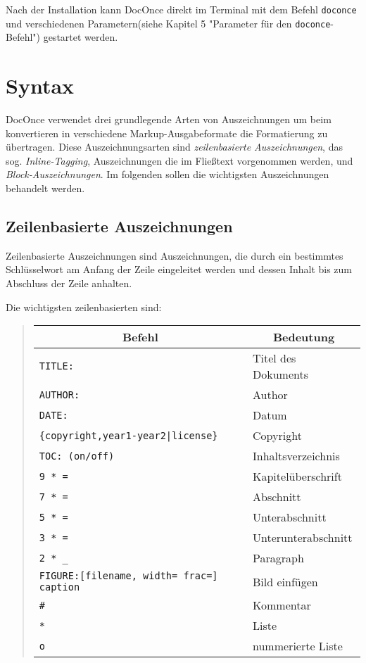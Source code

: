 \documentclass[%
oneside,                 %
final,                   %
chapterprefix=true,      %
open=right,              %
10pt]{book}
\begin{document}
Nach der Installation kann DocOnce direkt im Terminal mit dem Befehl \texttt{doconce} und verschiedenen Parametern(siehe Kapitel 5 "Parameter für den \texttt{doconce}-Befehl") gestartet werden.
\chapter{Syntax}
DocOnce verwendet drei grundlegende Arten von Auszeichnungen um beim konvertieren in verschiedene Markup-Ausgabeformate die Formatierung zu übertragen. Diese Auszeichnungsarten sind  \emph{zeilenbasierte Auszeichnungen}, das sog. \emph{Inline-Tagging}, Auszeichnungen die im Fließtext vorgenommen werden, und \emph{Block-Auszeichnungen}. Im folgenden sollen die wichtigsten Auszeichnungen behandelt werden.

\section{Zeilenbasierte Auszeichnungen}
Zeilenbasierte Auszeichnungen sind Auszeichnungen, die durch ein bestimmtes Schlüsselwort am Anfang der Zeile eingeleitet werden und dessen Inhalt bis zum Abschluss der Zeile anhalten.

Die wichtigsten zeilenbasierten sind:

\begin{quote}
\begin{tabular}{ll}
\hline
\multicolumn{1}{c}{ Befehl } & \multicolumn{1}{c}{ Bedeutung } \\
\hline
\texttt{TITLE:}                                  & Titel des Dokuments \\
\texttt{AUTHOR:}                                 & Author              \\
\texttt{DATE:}                                   & Datum               \\
\Verb!{copyright,year1-year2|license}!         & Copyright           \\
\texttt{TOC: (on/off)}                           & Inhaltsverzeichnis  \\
\texttt{9 * =}                                   & Kapitelüberschrift \\
\texttt{7 * =}                                   & Abschnitt           \\
\texttt{5 * =}                                   & Unterabschnitt      \\
\texttt{3 * =}                                   & Unterunterabschnitt \\
\Verb!2 * _!                                   & Paragraph           \\
\texttt{FIGURE:[filename, width= frac=] caption} & Bild einfügen      \\
\Verb!#!                                       & Kommentar           \\
\texttt{*}                                       & Liste               \\
\texttt{o}                                       & nummerierte Liste   \\
\hline
\end{tabular}
\end{quote}
\end{document}

